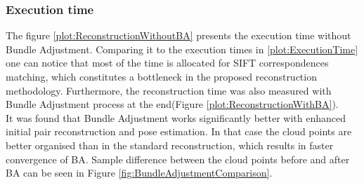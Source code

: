 \subsubsection{Execution time}
The figure \ref{plot:ReconstructionWithoutBA} presents the execution time without Bundle Adjustment. Comparing it to the execution times in \ref{plot:ExecutionTime} one can notice that most of the time is allocated for SIFT correspondences matching, which constitutes a bottleneck in the proposed reconstruction methodology. Furthermore, the reconstruction time was also measured with Bundle Adjustment process at the end(Figure \ref{plot:ReconstructionWithBA}). \\
It was found that Bundle Adjustment works significantly better with enhanced initial pair reconstruction and pose estimation. In that case the cloud points are better organised than in the standard reconstruction, which results in faster convergence of BA. Sample difference between the cloud points before and after BA can be seen in Figure \ref{fig:BundleAdjustmentComparison}.
